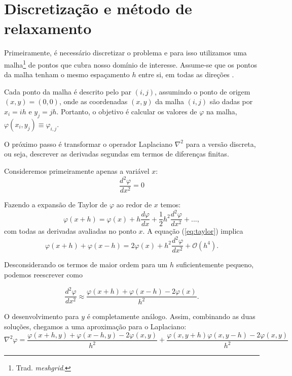 \documentclass[a4paper,12pt]{article}
\begin{document}
\section{Discretização e método de relaxamento}

Primeiramente, é necessário discretizar o problema e para isso utilizamos
uma malha\footnote{Trad. \textit{meshgrid}.} de pontos que cubra nosso domínio de interesse. Assume-se que
os pontos da malha tenham o mesmo espaçamento $h$ entre si, em todas as
direções \cite{giordanon.j1997}.

Cada ponto da malha é descrito pelo par $(i, j)$, assumindo o ponto de
origem $(x, y) = (0, 0)$, onde as coordenadas $(x, y)$ da malha $(i, j)$
são dadas por $x_i=ih$ e $y_j=jh$. Portanto, o objetivo é calcular os valores de $\varphi$ na malha, $\varphi(x_i, y_j) \equiv \varphi_{i, j}$.

O próximo passo é transformar o operador Laplaciano $\nabla^2$ para a versão discreta, ou seja, descrever as derivadas segundas em termos de diferenças finitas.

Consideremos primeiramente apenas a variável $x$:
\begin{equation*}
  \frac{d^2\varphi}{dx^2} = 0
\end{equation*}

Fazendo a expansão de Taylor de $\varphi$ ao redor de $x$ temos:
\begin{equation}
  \varphi(x + h) = \varphi(x)+h\frac{d\varphi}{dx}+\frac{1}{2}h^2\frac{d^2\varphi}{dx^2}+...,
  \label{eq:taylor}
\end{equation}
com todas as derivadas avaliadas no ponto $x$. A equação (\ref{eq:taylor}) implica
\begin{equation*}
  \varphi(x + h) + \varphi(x - h) = 2\varphi(x)+h^2\frac{d^2\varphi}{dx^2}+\mathcal{O}(h^4).
\end{equation*}

Desconsiderando os termos de maior ordem para um $h$ suficientemente pequeno, podemos reescrever como

\begin{equation*}
  \frac{d^2\varphi}{dx^2} \approx \frac{\varphi(x+h)+\varphi(x-h)-2\varphi(x)}{h^2}.
\end{equation*}

O desenvolvimento para $y$ é completamente análogo. Assim, combinando as duas soluções, chegamos a uma aproximação para o Laplaciano:
\begin{equation*}
  \nabla^2 \varphi = \frac{\varphi(x+h,y)+\varphi(x-h,y)-2\varphi(x,y)}{h^2} +
  \frac{\varphi(x,y+h)\varphi(x,y-h)-2\varphi(x,y)}{h^2}
\end{equation*}
\end{document}
